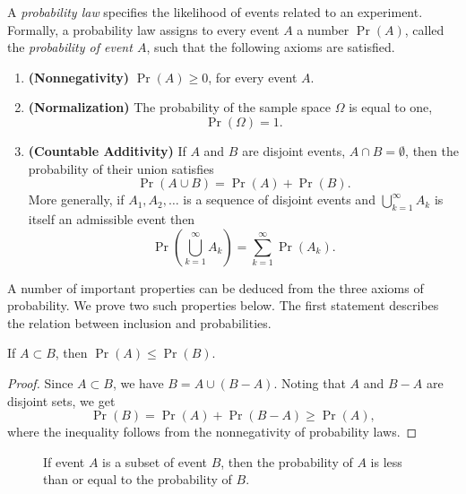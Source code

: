 A \emph{probability law} specifies the likelihood of events related to an experiment.
Formally, a probability law assigns to every event $A$ a number $\Pr (A)$, called the \emph{probability of event $A$}, such that the following axioms are satisfied.
\begin{enumerate}
\item \textbf{(Nonnegativity)} $\Pr (A) \geq 0$, for every event $A$.
\item \textbf{(Normalization)} The probability of the sample space $\Omega$ is equal to one,
\begin{equation*}
\Pr (\Omega) = 1 .
\end{equation*}
\item \textbf{(Countable Additivity)} If $A$ and $B$ are disjoint events, $A \cap B = \emptyset$, then the probability of their union satisfies
\begin{equation*}
\Pr (A \cup B) = \Pr (A) + \Pr (B) .
\end{equation*}
More generally, if $A_1, A_2, \ldots$ is a sequence of disjoint events and $\bigcup_{k=1}^{\infty} A_k$ is itself an admissible event then
\begin{equation*}
\Pr \left( \bigcup_{k=1}^{\infty} A_k \right)
= \sum_{k = 1}^{\infty} \Pr (A_k) .
\end{equation*}
\end{enumerate}

A number of important properties can be deduced from the three axioms of probability.
We prove two such properties below.
The first statement describes the relation between inclusion and probabilities.
\begin{proposition}
If $A \subset B$, then $\Pr (A) \leq \Pr (B)$.
\end{proposition}
\begin{proof}
Since $A \subset B$, we have $B = A \cup (B - A)$.
Noting that $A$ and $B - A$ are disjoint sets, we get
\begin{equation*}
\Pr (B) = \Pr (A) + \Pr (B - A) \geq \Pr (A) ,
\end{equation*}
where the inequality follows from the nonnegativity of probability laws.
\end{proof}
\begin{figure}[htb!]
\begin{center}
\caption{If event $A$ is a subset of event $B$, then the probability of $A$ is less than or equal to the probability of $B$.}
\end{center}
\end{figure}


